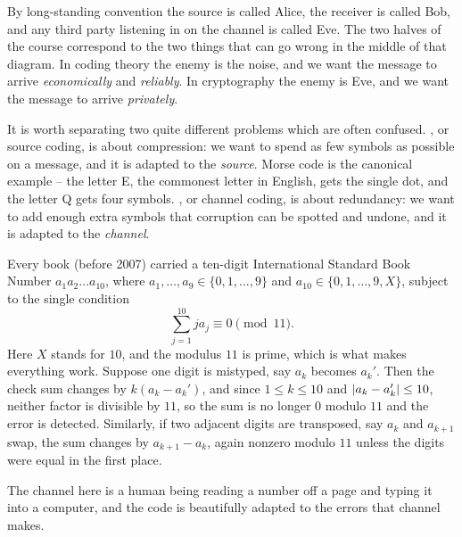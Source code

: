 \documentclass[a4paper]{scrartcl}
\begin{document}
\begin{center}
\end{center}

By long-standing convention the source is called Alice, the receiver is called Bob, and any third party listening in on the channel is called Eve. The two halves of the course correspond to the two things that can go wrong in the middle of that diagram. In coding theory the enemy is the noise, and we want the message to arrive \emph{economically} and \emph{reliably}. In cryptography the enemy is Eve, and we want the message to arrive \emph{privately}.

It is worth separating two quite different problems which are often confused. , or source coding, is about compression: we want to spend as few symbols as possible on a message, and it is adapted to the \emph{source}. Morse code is the canonical example -- the letter E, the commonest letter in English, gets the single dot, and the letter Q gets four symbols. , or channel coding, is about redundancy: we want to add enough extra symbols that corruption can be spotted and undone, and it is adapted to the \emph{channel}.

\begin{example}[ISBNs]
	Every book (before 2007) carried a ten-digit International Standard Book Number $a_1 a_2 \dots a_{10}$, where $a_1, \dots, a_9 \in \{0, 1, \dots, 9\}$ and $a_{10} \in \{0, 1, \dots, 9, X\}$, subject to the single condition
	$$\sum_{j=1}^{10} j a_j \equiv 0 \pmod{11}.$$
	Here $X$ stands for $10$, and the modulus $11$ is prime, which is what makes everything work. Suppose one digit is mistyped, say $a_k$ becomes $a_k'$. Then the check sum changes by $k(a_k - a_k')$, and since $1 \le k \le 10$ and $\lvert a_k - a_k'\rvert \le 10$, neither factor is divisible by $11$, so the sum is no longer $0$ modulo $11$ and the error is detected. Similarly, if two adjacent digits are transposed, say $a_k$ and $a_{k+1}$ swap, the sum changes by $a_{k+1} - a_k$, again nonzero modulo $11$ unless the digits were equal in the first place.

	The channel here is a human being reading a number off a page and typing it into a computer, and the code is beautifully adapted to the errors that channel makes.
\end{example}
\end{document}
